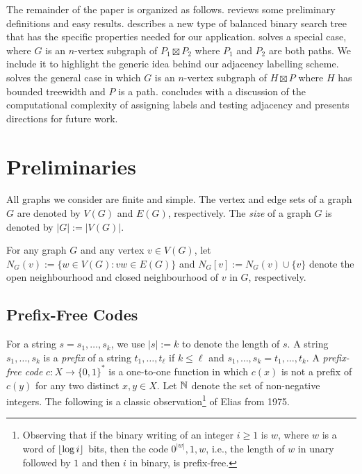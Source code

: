 \documentclass[kpfonts]{patmorin}
\newcommand{\pnote}[1]{\ \newline\noindent\fcolorbox{red}{yellow}{\begin{minipage}{\textwidth}#1\end{minipage}}}
\let\le\leqslant
\let\ge\geqslant
\begin{document}
The remainder of the paper is organized as follows.  reviews some preliminary definitions and easy results.   describes a new type of balanced binary search tree that has the specific properties needed for our application.  solves a special case, where $G$ is an $n$-vertex subgraph of $P_1\boxtimes P_2$ where $P_1$ and $P_2$ are both paths. We include it to highlight the generic idea behind our adjacency labelling scheme.  solves the general case in which $G$ is an $n$-vertex subgraph of $H\boxtimes P$ where $H$ has bounded treewidth and $P$ is a path.   concludes with a discussion of the computational complexity of assigning labels and testing adjacency and presents directions for future work.



\section{Preliminaries}

All graphs we consider are finite and simple.  The vertex and edge sets of a graph $G$ are denoted by $V(G)$ and $E(G)$, respectively.  The \emph{size} of a graph $G$ is denoted by $|G|:=|V(G)|$.

For any graph $G$ and any vertex $v\in V(G)$, let $N_G(v):=\{w\in V(G): vw\in E(G)\}$ and $N_G[v]:=N_G(v)\cup\{v\}$ denote the open neighbourhood and closed neighbourhood of $v$ in $G$, respectively.

\subsection{Prefix-Free Codes}

For a string $s=s_1,\dots,s_k$, we use $|s|:=k$ to denote the length of $s$.
A string $s_1,\dots,s_k$ is a \emph{prefix} of a string $t_1,\dots,t_\ell$ if $k\le \ell$ and $s_1,\dots,s_k=t_1,\dots,t_k$.  A \emph{prefix-free code} $c:X\to\{0,1\}^*$ is a one-to-one function in which $c(x)$ is not a prefix of $c(y)$ for any two distinct $x,y\in X$.  Let $\mathbb{N}$ denote the set of non-negative integers.  The following is a classic observation\footnote{Observing that if the binary writing of an integer $i\ge 1$ is $w$, where $w$ is a word of ${\lfloor \log{i} \rfloor}$ bits, then the code $0^{|w|},1,w$, i.e., the length of $w$ in unary followed by $1$ and then $i$ in binary, is prefix-free.} of Elias from 1975.
\end{document}
